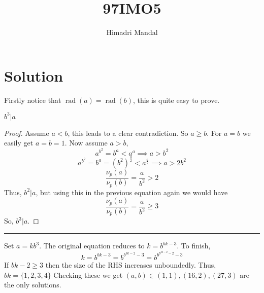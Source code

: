\documentclass[11pt]{scrartcl}
\title{97IMO5}
\author{Himadri Mandal}
\begin{document}
\maketitle

\section{Solution}
\newcommand\rad
{\operatorname{rad}}
\begin{soln}
  Firstly notice that $\rad(a) = \rad(b)$, this is quite easy to prove.
  \begin{claim*}
    $b^3 | a$
  \end{claim*}
  \begin{proof}
    Assume $a < b$, this leads to a clear contradiction. So $a \geq b$. For 
    $a = b$ we easily get $a = b =1$. Now assume $a > b$, 
    \[ a^{b^2} = b^a < a^a \implies a > b^2\]
    \[ a^{b^2} = b^a = (b^2)^{\frac{a}{2}} < a^{\frac{a}2} \implies a > 2b^2 \]
    \[ \frac{\nu_p(a)}{\nu_p(b)} = \frac{a}{b^2} > 2 \]
    Thus, $b^2 | a$, but using this in the previous equation again we would have 
    \[ \frac{\nu_p(a)}{\nu_p(b)} = \frac{a}{b^2} \geq 3 \]
    So, $b^3 | a$.
  \end{proof}
  \hrule

  \bigskip
  Set $a = kb^3$. The original equation reduces to $k = b^{bk - 3}$. To finish,
  \[ k = b^{bk - 3} = b^{b^{bk - 2} - 3} = b^{b^{b^{bk - 2} - 2} -3} \]
  If $bk - 2 \geq 3$ then the size of the RHS increases unboundedly. Thus, $bk = \{1,2,3,4\}$
  Checking these we get $(a,b) \in (1,1),(16,2),(27,3)$ are the only solutions.
\end{soln} 
\end{document}

